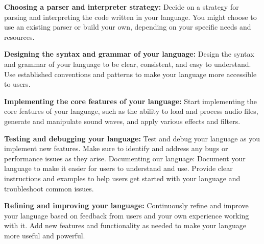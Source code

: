 \textbf {Choosing a parser and interpreter strategy:} Decide on a strategy for parsing and interpreting the code written in your language. You might choose to use an existing parser or build your own, depending on your specific needs and resources. 

\textbf {Designing the syntax and grammar of your language:} Design the syntax and grammar of your language to be clear, consistent, and easy to understand. Use established conventions and patterns to make your language more accessible to users. 

\textbf {Implementing the core features of your language:} Start implementing the core features of your language, such as the ability to load and process audio files, generate and manipulate sound waves, and apply various effects and filters.

\textbf {Testing and debugging your language:} Test and debug your language as you implement new features. Make sure to identify and address any bugs or performance issues as they arise. 
Documenting our language: Document your language to make it easier for users to understand and use. Provide clear instructions and examples to help users get started with your language and troubleshoot common issues. 

\textbf {Refining and improving your language:} Continuously refine and improve your language based on feedback from users and your own experience working with it. Add new features and functionality as needed to make your language more useful and powerful.

